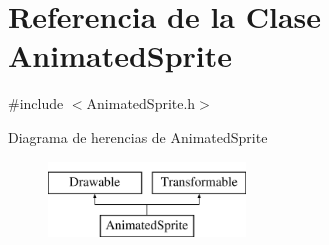 \hypertarget{classAnimatedSprite}{}\section{Referencia de la Clase Animated\+Sprite}
\label{classAnimatedSprite}


{\ttfamily \#include $<$Animated\+Sprite.\+h$>$}

Diagrama de herencias de Animated\+Sprite\begin{figure}[H]
\begin{center}
\leavevmode
\includegraphics[height=2.000000cm]{classAnimatedSprite}
\end{center}
\end{figure}
